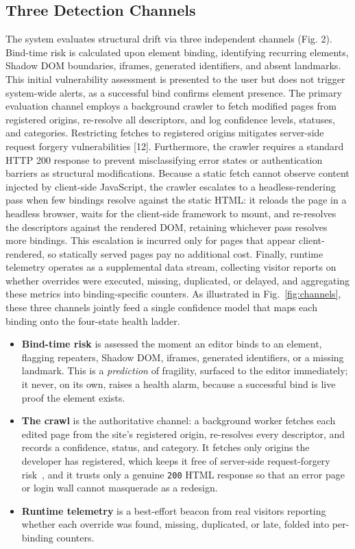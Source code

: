 \documentclass[conference]{IEEEtran}
\begin{document}
\subsection{Three Detection Channels}
The system evaluates structural drift via three independent channels (Fig. 2). Bind-time risk is calculated upon element binding, identifying recurring elements, Shadow DOM boundaries, iframes, generated identifiers, and absent landmarks. This initial vulnerability assessment is presented to the user but does not trigger system-wide alerts, as a successful bind confirms element presence. The primary evaluation channel employs a background crawler to fetch modified pages from registered origins, re-resolve all descriptors, and log confidence levels, statuses, and categories. Restricting fetches to registered origins mitigates server-side request forgery vulnerabilities [12]. Furthermore, the crawler requires a standard HTTP 200 response to prevent misclassifying error states or authentication barriers as structural modifications. Because a static fetch cannot observe content injected by client-side JavaScript, the crawler escalates to a headless-rendering pass when few bindings resolve against the static HTML: it reloads the page in a headless browser, waits for the client-side framework to mount, and re-resolves the descriptors against the rendered DOM, retaining whichever pass resolves more bindings. This escalation is incurred only for pages that appear client-rendered, so statically served pages pay no additional cost. Finally, runtime telemetry operates as a supplemental data stream, collecting visitor reports on whether overrides were executed, missing, duplicated, or delayed, and aggregating these metrics into binding-specific counters. As illustrated in Fig.~\ref{fig:channels}, these three channels jointly feed a single confidence model that maps each binding onto the four-state health ladder.
\begin{itemize}
\item \textbf{Bind-time risk} is assessed the moment an editor binds to an element, flagging repeaters, Shadow DOM, iframes, generated identifiers, or a missing landmark. This is a \emph{prediction} of fragility, surfaced to the editor immediately; it never, on its own, raises a health alarm, because a successful bind is live proof the element exists.
\item \textbf{The crawl} is the authoritative channel: a background worker fetches each edited page from the site's registered origin, re-resolves every descriptor, and records a confidence, status, and category. It fetches only origins the developer has registered, which keeps it free of server-side request-forgery risk~\cite{ssrf}, and it trusts only a genuine \texttt{200} HTML response so that an error page or login wall cannot masquerade as a redesign.
\item \textbf{Runtime telemetry} is a best-effort beacon from real visitors reporting whether each override was found, missing, duplicated, or late, folded into per-binding counters.
\end{itemize}
\end{document}
